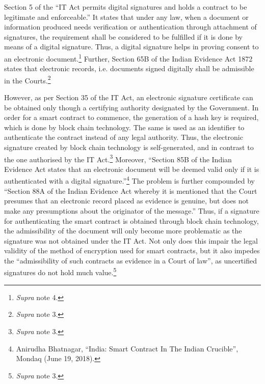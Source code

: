 \begin{multicols}{2}
\noi
Section 5 of the “IT Act permits digital signatures and holds a contract to be legitimate and
enforceable.” It states that under any law, when a document or information produced needs verification or authentication through attachment of signatures, the requirement shall be
considered to be fulfilled if it is done by means of a digital signature. Thus, a digital signature
helps in proving consent to an electronic document.\footnote{\textit{Supra} note 4.} Further, Section 65B of the Indian
Evidence Act 1872 states that electronic records, i.e. documents signed digitally shall be
admissible in the Courts.\footnote{\textit{Supra} note 3.}

\noi
However, as per Section 35 of the IT Act, an electronic signature certificate can be obtained
only though a certifying authority designated by the Government. In order for a smart
contract to commence, the generation of a hash key is required, which is done by block chain
technology. The same is used as an identifier to authenticate the contract instead of any legal
authority. Thus, the electronic signature created by block chain technology is self-generated,
and in contrast to the one authorised by the IT Act.\footnote{\textit{Supra} note 3.} Moreover, “Section 85B of the Indian
Evidence Act states that an electronic document will be deemed valid only if it is
authenticated with a digital signature.”\footnote{Anirudha Bhatnagar, “India: Smart Contract In The Indian Crucible”, Mondaq (June 19, 2018). } The problem is further compounded by “Section 88A
of the Indian Evidence Act whereby it is mentioned that the Court presumes that an electronic
record placed as evidence is genuine, but does not make any presumptions about the
originator of the message.” Thus, if a signature for authenticating the smart contract is
obtained through block chain technology, the admissibility of the document will only become
more problematic as the signature was not obtained under the IT Act. Not only does this
impair the legal validity of the method of encryption used for smart contracts, but it also
impedes the “admissibility of such contracts as evidence in a Court of law”, as uncertified
signatures do not hold much value.\footnote{\textit{Supra} note 3.}

\vspace{-.1cm}


\vspace{-.1cm}


\end{multicols}
